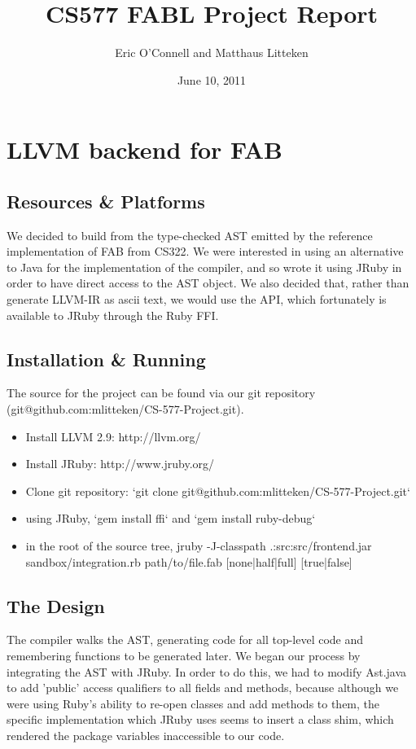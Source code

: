 \documentclass[11pt]{article} %
\title{CS577 FABL Project Report}
\author{Eric O'Connell and Matthaus Litteken}
\date{June 10, 2011}
\begin{document}
\maketitle

\section{LLVM backend for FAB}

\subsection{Resources \& Platforms}
We decided to build from the type-checked AST emitted by the reference implementation of FAB from CS322. We were interested in using an alternative to Java for the implementation of the compiler, and so wrote it using JRuby in order to have direct access to the AST object. We also decided that, rather than generate LLVM-IR as ascii text, we would use the API, which fortunately is available to JRuby through the Ruby FFI.

\subsection{Installation \& Running}
The source for the project can be found via our git repository (git@github.com:mlitteken/CS-577-Project.git).

\begin{itemize}
\item{Install LLVM 2.9: http://llvm.org/}
\item{Install JRuby: http://www.jruby.org/}
\item{Clone git repository: `git clone git@github.com:mlitteken/CS-577-Project.git`}
\item{using JRuby, `gem install ffi` and `gem install ruby-debug`}
\item{in the root of the source tree, jruby -J-classpath .:src:src/frontend.jar sandbox/integration.rb path/to/file.fab [none|half|full] [true|false]}
\end{itemize}

\subsection{The Design}

The compiler walks the AST, generating code for all top-level code and remembering functions to be generated later. We began our process by integrating the AST with JRuby. In order to do this, we had to modify Ast.java to add 'public' access qualifiers to all fields and methods, because although we were using Ruby's ability to re-open classes and add methods to them, the specific implementation which JRuby uses seems to insert a class shim, which rendered the package variables inaccessible to our code.
\end{document}
